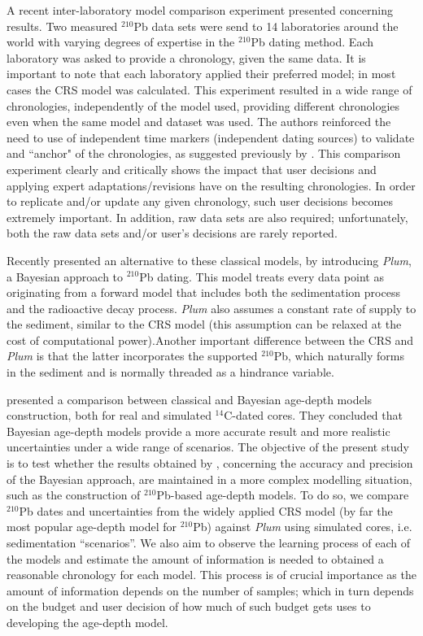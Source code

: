 \documentclass [10pt] {article}
\begin{document}
A recent inter-laboratory model comparison experiment \citep{Barsanti2020} presented concerning results.
Two measured $^{210}$Pb data sets were send to 14 laboratories around the world with varying degrees of expertise in the $^{210}$Pb dating method.
Each laboratory was asked to provide a chronology, given the same data. 
It is important to note that each laboratory applied their preferred model; in most cases the CRS model was calculated.
This experiment resulted in a wide range of chronologies, independently of the model used, providing different chronologies even when the same model and dataset was used.
The authors reinforced the need to use of independent time markers (independent dating sources) to validate and ``anchor" of the chronologies, as suggested previously by \citep{Smith2001}.  
This comparison experiment clearly and critically shows the impact that user decisions and applying expert adaptations/revisions have on the resulting chronologies.
In order to replicate and/or update any given chronology, such user decisions becomes extremely important.
In addition, raw data sets are also required; unfortunately, both the raw data sets and/or user's decisions are rarely reported.

Recently \citet{Aquino2018} presented an alternative to these classical models, by introducing \textit{Plum}, a Bayesian approach to $^{210}$Pb dating.
This model treats every data point as originating from a forward model that includes both the sedimentation process and the radioactive decay process.
\textit{Plum} also assumes a constant rate of supply to the sediment, similar to the CRS model (this assumption can be relaxed at the cost of computational power).Another important difference between the CRS and \textit{Plum} is that the latter incorporates the supported $^{210}$Pb, which naturally forms in the sediment and is normally threaded as a hindrance variable.

\citet{Blaauw2018} presented a comparison between classical and Bayesian age-depth models construction, both for real and simulated $^{14}$C-dated cores.
They concluded that Bayesian age-depth models provide a more accurate result and more realistic uncertainties under a wide range of scenarios.  
The objective of the present study is to test whether the results obtained by \citet{Blaauw2018}, concerning the accuracy and precision of the Bayesian approach, are maintained in a more complex modelling situation, such as the construction of $^{210}$Pb-based age-depth models.
To do so, we compare $^{210}$Pb dates and uncertainties from the widely applied CRS model (by far the most popular age-depth model for $^{210}$Pb) against \textit{Plum} using simulated cores, i.e. sedimentation ``scenarios''.
We also aim to observe the learning process of each of the models and estimate the amount of information is needed to obtained a reasonable chronology for each model.
This process is of crucial importance as the amount of information depends on the number of samples; which in turn depends on the budget and user decision of how much of such budget gets uses to developing the age-depth model. 
\end{document}

